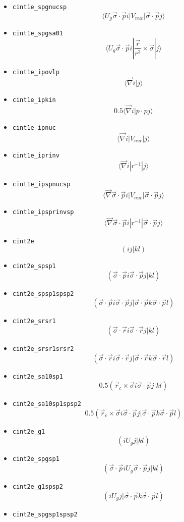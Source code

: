 \documentclass{article}
\begin{document}
\begin{itemize}
\item
  \verb!cint1e_spgnucsp!
  \[\langle U_g \vec{\sigma}\cdot\vec{p} i| V_{nuc} | \vec{\sigma}\cdot\vec{p}j\rangle \]
\item
  \verb!cint1e_spgsa01!
  \[\langle U_g \vec{\sigma}\cdot\vec{p} i| \frac{\vec{r}}{r^3} \times\vec{\sigma} |j\rangle \]
\item
  \verb!cint1e_ipovlp! \[\langle \vec{\nabla} i|j\rangle \]
\item
  \verb!cint1e_ipkin!
  \[0.5\langle \vec{\nabla} i| p \cdot pj\rangle \]
\item
  \verb!cint1e_ipnuc! \[\langle \vec{\nabla} i| V_{nuc}|j\rangle \]
\item
  \verb!cint1e_iprinv! \[\langle \vec{\nabla} i| r^{-1}|j\rangle \]
\item
  \verb!cint1e_ipspnucsp!
  \[\langle \vec{\nabla} \vec{\sigma}\cdot\vec{p} i| V_{nuc}| \vec{\sigma}\cdot\vec{p}j\rangle \]
\item
  \verb!cint1e_ipsprinvsp!
  \[\langle \vec{\nabla} \vec{\sigma}\cdot\vec{p} i| r^{-1}| \vec{\sigma}\cdot\vec{p}j\rangle \]
\item
  \verb!cint2e! \[(ij|kl)\]
\item
  \verb!cint2e_spsp1!
  \[(\vec{\sigma}\cdot\vec{p} i \vec{\sigma}\cdot\vec{p} j| k l)\]
\item
  \verb!cint2e_spsp1spsp2!
  \[(\vec{\sigma}\cdot\vec{p} i \vec{\sigma}\cdot\vec{p} j| \vec{\sigma}\cdot\vec{p} k \vec{\sigma}\cdot\vec{p} l)\]
\item
  \verb!cint2e_srsr1!
  \[(\vec{\sigma}\cdot\vec{r} i \vec{\sigma}\cdot\vec{r} j| kl)\]
\item
  \verb!cint2e_srsr1srsr2!
  \[(\vec{\sigma}\cdot\vec{r} i \vec{\sigma}\cdot\vec{r} j| \vec{\sigma}\cdot\vec{r} k \vec{\sigma}\cdot\vec{r}l)\]
\item
  \verb!cint2e_sa10sp1!
  \[0.5 (\vec{r}_c \times\vec{\sigma} i \vec{\sigma}\cdot\vec{p} j| kl)\]
\item
  \verb!cint2e_sa10sp1spsp2!
  \[0.5 (\vec{r}_c \times\vec{\sigma} i \vec{\sigma}\cdot\vec{p} j| \vec{\sigma}\cdot\vec{p} k \vec{\sigma}\cdot\vec{p} l)\]
\item
  \verb!cint2e_g1! \[(i U_g j| kl)\]
\item
  \verb!cint2e_spgsp1!
  \[(\vec{\sigma}\cdot\vec{p} i U_g \vec{\sigma}\cdot\vec{p} j| kl)\]
\item
  \verb!cint2e_g1spsp2!
  \[(i U_g j| \vec{\sigma}\cdot\vec{p} k \vec{\sigma}\cdot\vec{p}l)\]
\item
  \verb!cint2e_spgsp1spsp2!

\end{itemize}
\end{document}
